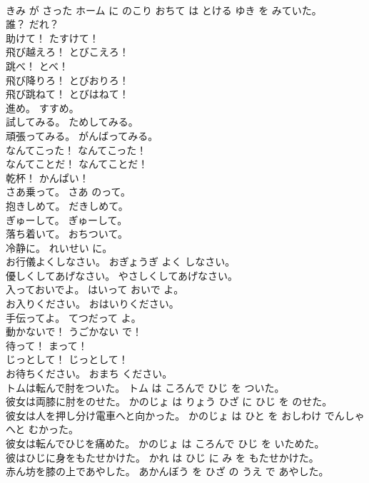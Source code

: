 \documentclass[8pt]{extreport}
\begin{document}
\begin{CJK}{UTF8}{min}
\\	きみ が さった ホーム に のこり おちて は とける ゆき を みていた。	
\\	誰？	だれ？	
\\	助けて！	たすけて！	
\\	飛び越えろ！	とびこえろ！	
\\	跳べ！	とべ！	
\\	飛び降りろ！	とびおりろ！	
\\	飛び跳ねて！	とびはねて！	
\\	進め。	すすめ。	
\\	試してみる。	ためしてみる。	
\\	頑張ってみる。	がんばってみる。	
\\	なんてこった！	なんてこった！	
\\	なんてことだ！	なんてことだ！	
\\	乾杯！	かんぱい！	
\\	さあ乗って。	さあ のって。	
\\	抱きしめて。	だきしめて。	
\\	ぎゅーして。	ぎゅーして。	
\\	落ち着いて。	おちついて。	
\\	冷静に。	れいせい に。	
\\	お行儀よくしなさい。	おぎょうぎ よく しなさい。	
\\	優しくしてあげなさい。	やさしくしてあげなさい。	
\\	入っておいでよ。	はいって おいで よ。	
\\	お入りください。	おはいりください。	
\\	手伝ってよ。	てつだって よ。	
\\	動かないで！	うごかない で！	
\\	待って！	まって！	
\\	じっとして！	じっとして！	
\\	お待ちください。	おまち ください。	
\\	トムは転んで肘をついた。	トム は ころんで ひじ を ついた。	
\\	彼女は両膝に肘をのせた。	かのじょ は りょう ひざ に ひじ を のせた。	
\\	彼女は人を押し分け電車へと向かった。	かのじょ は ひと を おしわけ でんしゃ へと むかった。	
\\	彼女は転んでひじを痛めた。	かのじょ は ころんで ひじ を いためた。	
\\	彼はひじに身をもたせかけた。	かれ は ひじ に み を もたせかけた。	
\\	赤ん坊を膝の上であやした。	あかんぼう を ひざ の うえ で あやした。	

\end{CJK}
\end{document}
